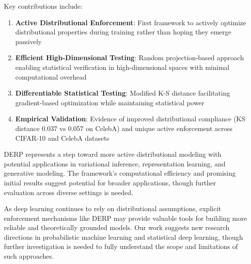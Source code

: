 \documentclass[11pt]{article}
\begin{document}
Key contributions include:

\begin{enumerate}
\item \textbf{Active Distributional Enforcement}: First framework to actively optimize distributional properties during training rather than hoping they emerge passively
\item \textbf{Efficient High-Dimensional Testing}: Random projection-based approach enabling statistical verification in high-dimensional spaces with minimal computational overhead  
\item \textbf{Differentiable Statistical Testing}: Modified K-S distance facilitating gradient-based optimization while maintaining statistical power
\item \textbf{Empirical Validation}: Evidence of improved distributional compliance (KS distance 0.037 vs 0.057 on CelebA) and unique active enforcement across CIFAR-10 and CelebA datasets
\end{enumerate}

DERP represents a step toward more active distributional modeling with potential applications in variational inference, representation learning, and generative modeling. The framework's computational efficiency and promising initial results suggest potential for broader applications, though further evaluation across diverse settings is needed.

As deep learning continues to rely on distributional assumptions, explicit enforcement mechanisms like DERP may provide valuable tools for building more reliable and theoretically grounded models. Our work suggests new research directions in probabilistic machine learning and statistical deep learning, though further investigation is needed to fully understand the scope and limitations of such approaches.



\end{document}
